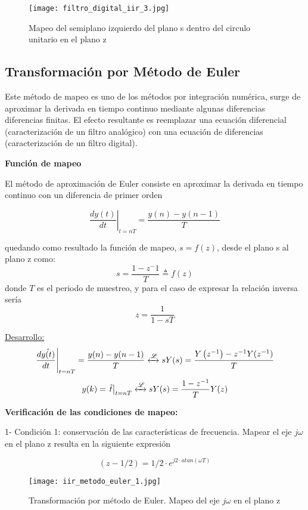 \documentclass[informe.tex]{subfiles}
\begin{document}
\begin{figure}[h]
		\centering
		\texttt{[image: filtro\_digital\_iir\_3.jpg]}
		\caption{Mapeo del semiplano izquierdo del plano s dentro del circulo unitario en el plano z}
		\label{fig:filtro_digital:iir:cond2}
		\end{figure}	
		

\newpage\subsection{Transformación por Método de Euler}
{
Este método de mapeo es uno de los métodos por integración numérica, surge de aproximar la derivada en tiempo continuo mediante algunas diferencias diferencias finitas. El efecto resultante es reemplazar una ecuación diferencial (caracterización de un filtro analógico) con una ecuación de diferencias (caracterización de un filtro digital).\newline

\textbf{Función de mapeo}\newline

	El método de aproximación de Euler consiste en aproximar la derivada en tiempo continuo con un diferencia de primer orden 

		$$
			\left. \frac{d y(t)}{dt} \right|_{t=nT} = \frac{y(n)-y(n-1)}{T}
		$$

quedando como resultado la función de mapeo, $s=f(z)$, desde el plano s al plano z como:
		$$
			s = \frac{1-z^-{1}}{T} \triangleq f(z)			
		$$
donde $T$ es el periodo de muestreo, y para el caso de expresar la relación inversa sería
		$$
			z = \frac{1}{1-sT}
		$$

\underline{Desarrollo:}
		$$
			\left. \frac{ d \hat{ y(t) } }{dt} \right|_{t=nT} 
			=
			\frac{y(n)-y(n-1)}{T}
				\xleftrightarrow[]{\mathscr{L}}						
			sY(s)= \frac{ Y\left(z^{-1}\right) - z^{-1} Y(z^{-1})}{ T }
		$$
		$$
			y(k)= \left. \hat{t} \right|_{t=nT} 
				\xleftrightarrow[]{\mathscr{L}}
				sY(s) = \frac{1-z^{-1}}{T}Y(z)
		$$\newline

\textbf{Verificación de las condiciones de mapeo:}\newline

1- Condición 1: conservación de las características de frecuencia. Mapear el eje $j\omega$ en el plano z resulta en la siguiente expresión 

		$$(z-1/2)=1/2 \cdot e^{j2\cdot atan(\omega T) }$$
		
		\begin{figure}[h!]
		\centering
		\texttt{[image: iir\_metodo\_euler\_1.jpg]}
		\caption{Transformación por método de Euler. Mapeo del eje $j\omega$ en el plano z}
		\label{fig:filtro_digital:iir:invariante_1}
		\end{figure}	
				
}
\end{document}
